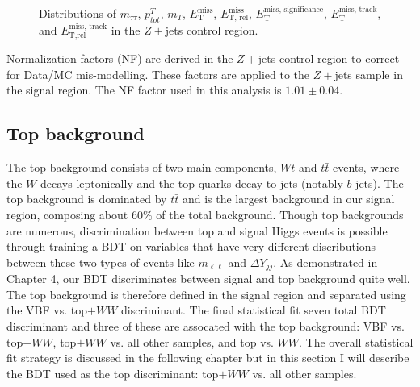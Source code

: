 \begin{figure}[!h]
{  }\hfill
  \hfill
{\caption{Distributions of $m_{\tau\tau}$, $p^T_{tot}$, $m_T$, $\ensuremath{E_{\text{T}}^{\text{miss}}}$, $\ensuremath{E_{\text{T, rel}}^{\text{miss}}}$, $\ensuremath{E_{\text{T}}^{\text{miss, significance}}}$, $\ensuremath{E_{\text{T}}^{\text{miss, track}}}$, and $\ensuremath{E_{\text{T,rel}}^{\text{miss, track}}}$ in the $Z+$jets control region.
\label{fig:DYCR3}}}
\end{figure}

Normalization factors (NF) are derived in the $Z+$jets control region to correct for Data/MC mis-modelling. These factors are applied to the $Z+$jets sample in the signal region. The NF factor used in this analysis is $1.01 \pm 0.04$. 

\subsection{Top background}
The top background consists of two main components, $Wt$ and $t\bar{t}$ events, where the $W$ decays leptonically and the top quarks decay to jets (notably $b$-jets). The top background is dominated by $t\bar{t}$ and is the largest background in our signal region, composing about $60\%$ of the total background. Though top backgrounds are numerous, discrimination between top and signal Higgs events is possible through training a BDT on variables that have very different discributions between these two types of events like $m_{\ell\ell}$ and $\Delta Y_{jj}$. As demonstrated in Chapter 4, our BDT discriminates between signal and top background quite well. The top background is therefore defined in the signal region and separated using the VBF vs. top$+WW$ discriminant. The final statistical fit seven total BDT discriminant and three of these are assocated with the top background: VBF vs. top$+WW$, top$+WW$ vs. all other samples, and top vs. $WW$. The overall statistical fit strategy is discussed in the following chapter but in this section I will describe the BDT used as the top discriminant: top$+WW$ vs. all other samples. 

